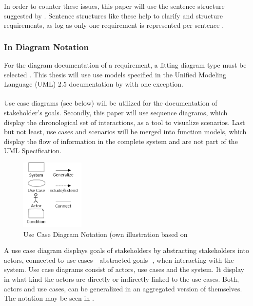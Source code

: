 In order to counter these issues, this paper will use the sentence structure suggested by \textcites[107]{Ebert.2014}[246]{Pohl.2007}. Sentence structures like these help to clarify and structure requirements, as log as only one requirement is represented per sentence \parencite[107]{Ebert.2014}. 


\subsubsection{In Diagram Notation}
For the diagram documentation of a requirement, a fitting diagram type must be selected \textcite[299]{Pohl.2007}.  This thesis will use use models specified in the Unified Modeling Language (UML) 2.5 documentation by \textcite{ObjectManagementGroup.01.03.2015} with one exception. 

\paragraph{\label{par:useCaes}}
Use case diagrams (see below) will be utilized for the documentation of stakeholder's goals. Secondly, this paper will use sequence diagrams, which display the chronological set of interactions, as a tool to visualize scenarios. Last but not least, use cases and scenarios will be merged into function models, which display the flow of information in the complete system and are not part of the UML Specification. 

\begin{figure}[H] 
    \centering
    \includegraphics[width=0.28\textwidth]{img/ucSymb.png}
    \caption{Use Case Diagram Notation (own illustration based on \cite[163]{Pohl.2007}}\label{fig:ucSymb}
\end{figure}

A use case diagram displays goals of stakeholders by abstracting stakeholders into actors, connected to use cases - abstracted goals -, when interacting with the system. Use case diagrams consist of actors, use cases and the system. It display in what kind the actors are directly or indirectly linked to the use cases. Both, actors and use cases, can be generalized in an aggregated version of themselves. The notation may be seen in .

